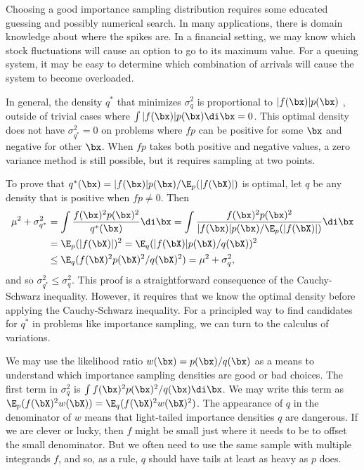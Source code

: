 Choosing a good importance sampling distribution requires some educated guessing and possibly numerical search. In many applications, there is domain knowledge about where the spikes are. In a financial setting, we may know which stock fluctuations will cause an option to go to its maximum value. For a queuing system, it may be easy to determine which combination of arrivals will cause the system to become overloaded.

In general, the density $q^*$ that minimizes $\sigma_q^2$ is proportional to $|f(\bx)|p(\bx)$ \citep{kahnMethodsReducingSample1953}, outside of trivial cases where $\int |f(\bx)|p(\bx) \di \bx = 0$. This optimal density does not have $\sigma_{q^*}^2 = 0$ on problems where $fp$ can be positive for some $\bx$ and negative for other $\bx$. When $fp$ takes both positive and negative values, a zero variance method is still possible, but it requires sampling at two points.

To prove that $q^*(\bx) = |f(\bx)|p(\bx)/\E_p(|f(\bX)|)$ is optimal, let $q$ be any density that is positive when $fp \neq 0$. Then
\begin{align*}
	\mu^2 + \sigma_{q^*}^2 & = \int \frac{f(\bx)^2p(\bx)^2}{q^*(\bx)} \di \bx = \int \frac{f(\bx)^2p(\bx)^2}{|f(\bx)|p(\bx)/\E_p(|f(\bX)|)} \di \bx \\
	                       & = \E_p(|f(\bX)|)^2 = \E_q(|f(\bX)|p(\bX)/q(\bX))^2                                                                     \\
	                       & \leq \E_q(f(\bX)^2p(\bX)^2/q(\bX)^2) = \mu^2 + \sigma_q^2,
\end{align*}
and so $\sigma_{q^*}^2 \leq \sigma_q^2$. This proof is a straightforward consequence of the Cauchy-Schwarz inequality. However, it requires that we know the optimal density before applying the Cauchy-Schwarz inequality. For a principled way to find candidates for $q^*$ in problems like importance sampling, we can turn to the calculus of variations.

We may use the likelihood ratio $w(\bx) = p(\bx)/q(\bx)$ as a means to understand which importance sampling densities are good or bad choices. The first term in $\sigma_q^2$ is $\int f(\bx)^2p(\bx)^2/q(\bx) \di \bx$. We may write this term as $\E_p(f(\bX)^2w(\bX)) = \E_q(f(\bX)^2w(\bX)^2)$. The appearance of $q$ in the denominator of $w$ means that light-tailed importance densities $q$ are dangerous. If we are clever or lucky, then $f$ might be small just where it needs to be to offset the small denominator. But we often need to use the same sample with multiple integrands $f$, and so, as a rule, $q$ should have tails at least as heavy as $p$ does.

